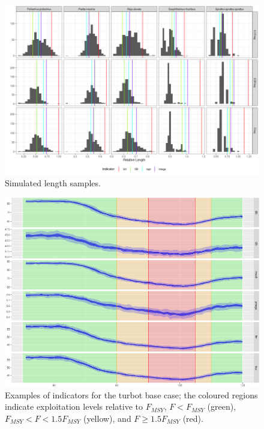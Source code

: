 \documentclass[12pt,doublespacing,a4paper]{ouparticle}
\begin{document}
\newpage
\begin{figure}[h]
\centering
\includegraphics[width=\textwidth]{roc-lf-1.png}
\caption{Simulated length samples.}
\label{fig:samples}
\end{figure}

\newpage
\begin{figure}[h]
\centering
\includegraphics[width=\textwidth]{roc-inds-1.png}
\caption{Examples of indicators for the turbot base case; the coloured regions indicate exploitation levels relative to $F_{MSY}$, $F<F_{MSY}$ (green),  $F_{MSY} <F< 1.5F_{MSY}$ (yellow), and $F \geq 1.5F_{MSY}$ (red).}
\label{fig:indicators}
\end{figure}
\end{document}
